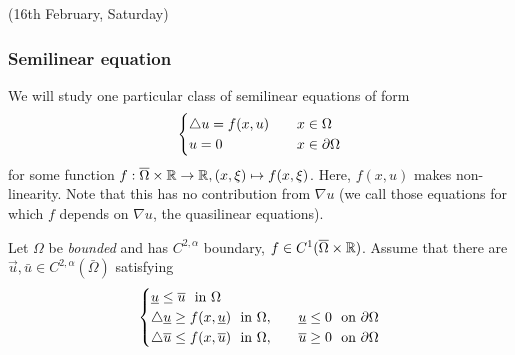 \documentclass[12pt,a4paper]{article}
\begin{document}
\newday

(16th February, Saturday)
\s

\subsubsection*{Semilinear equation}

We will study one particular class of semilinear equations of form
\begin{align*}
\begin{cases}
\triangle u = f(x,u)\quad & x\in \Omega \\
u=0 \quad & x\in \partial \Omega
\end{cases}
\end{align*}
for some function $f: \overline{\Omega} \times \mathbb{R} \rightarrow \mathbb{R}, (x,\xi) \mapsto f(x, \xi)$. Here, $f(x, u)$ makes non-linearity. Note that this has no contribution from $\nabla u$ (we call those equations for which $f$ depends on $\nabla u$, the quasilinear equations). 
\s

\thm Let $\Omega$ be \emph{bounded} and has $C^{2, \alpha}$ boundary, $f\in C^1(\overline{\Omega} \times \mathbb{R})$. Assume that there are $\vec{u}, \bar{u} \in C^{2, \alpha}(\bar{\Omega})$ satisfying
\begin{align*}
\begin{cases}
\underline{u} \leq \overline{u} \,\, \text{ in } \Omega \quad & {} \\
\triangle \underline{u} \geq f(x, \underline{u}) \,\, \text{ in }\Omega,\quad & \underline{u} \leq 0 \,\, \text{ on } \partial \Omega \\
\triangle \overline{u} \leq f(x,\overline{u}) \,\, \text{ in }\Omega, \quad & \overline{u} \geq 0 \,\,  \text{ on }\partial \Omega
\end{cases}
\end{align*}
\end{document}
